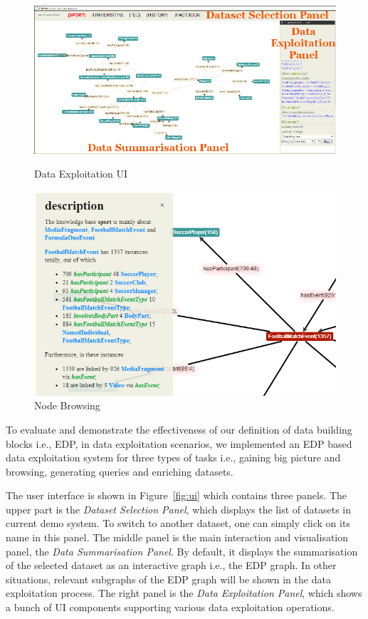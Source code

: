 
\begin{figure}
  \includegraphics[scale=0.30, trim=12mm 1mm 5cm 1cm]{figures/ui_general_annotated.png}
 \caption{Data Exploitation UI}\label{fig:ui}
\endminipage\hfill
{}
  \includegraphics[scale=0.30]{figures/node.png}
  \caption{Node Browsing}\label{fig:node}
\endminipage
\end{figure}
\vspace{-2mm}
To evaluate and demonstrate the effectiveness of our definition of data building blocks i.e., EDP, in data exploitation scenarios, we implemented an EDP based data exploitation system for three types of tasks i.e., gaining big picture and browsing, generating queries and enriching datasets. 

The user interface is shown in Figure~\ref{fig:ui} which contains three panels. The upper part is the \emph{Dataset Selection Panel}, which displays the list of datasets in current demo system. To switch to another dataset, one can simply click on its name in this panel. The middle panel is the main interaction and visualisation panel, the \emph{Data Summarisation Panel}. By default, it displays the summarisation of the selected dataset as an interactive graph i.e., the EDP graph. In other situations, relevant subgraphs of the EDP graph will be shown in the data exploitation process. The right panel is the \emph{Data Exploitation Panel}, which shows a bunch of UI components supporting various data exploitation operations.

